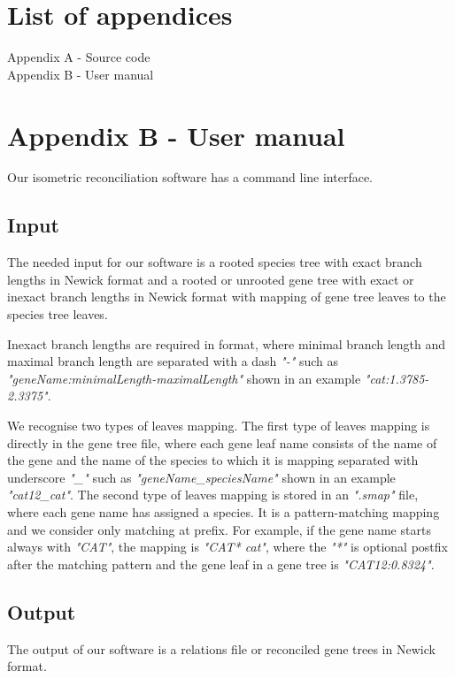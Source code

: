 \chapter*{List of appendices}

Appendix A - Source code \\
Appendix B - User manual

\chapter*{Appendix B - User manual}

Our isometric reconciliation software has a command line interface.

\section*{Input}

The needed input for our software is a rooted species tree with exact branch lengths in Newick format and a rooted or unrooted gene tree with exact or inexact branch lengths in Newick format with mapping of gene tree leaves to the species tree leaves.

Inexact branch lengths are required in format, where minimal branch length and maximal branch length are separated with a dash \emph{"-"} such as \emph{"geneName:minimalLength-maximalLength"} shown in an example \emph{"cat:1.3785-2.3375"}.

We recognise two types of leaves mapping. The first type of leaves mapping is directly in the gene tree file, where each gene leaf name consists of the name of the gene and the name of the species to which it is mapping separated with underscore \emph{"\_"} such as \emph{"geneName\_speciesName"} shown in an example \emph{"cat12\_cat"}. The second type of leaves mapping is stored in an \emph{".smap"} file, where each gene name has assigned a species. It is a pattern-matching mapping and we consider only matching at prefix. For example, if the gene name starts always with \emph{"CAT"}, the mapping is \emph{"CAT*	cat"}, where the \emph{"*"} is optional postfix after the matching pattern and the gene leaf in a gene tree is \emph{"CAT12:0.8324"}.

\section*{Output}

The output of our software is a relations file or reconciled gene trees in Newick format.


